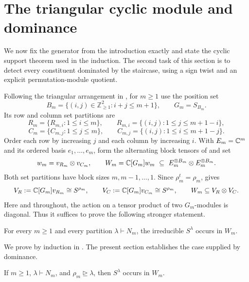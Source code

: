 \section{The triangular cyclic module and dominance}
\label{sec:dominance}

We now fix the generator from the introduction exactly and state the
cyclic support theorem used in the induction. The second task of this
section is to detect every constituent dominated by the staircase,
using a sign twist and an explicit permutation-module quotient.

Following the triangular arrangement in \cite[Section~4]{ikenmeyer2015},
for $m\ge1$ use the position set
\begin{equation}
 B_m=\{(i,j)\in\mathbb Z_{\ge1}^2:i+j\le m+1\},
 \qquad G_m=S_{B_m}.
 \label{dom:triangle}
\end{equation}
Its row and column set partitions are
\[
 R_m=\{R_{m,i}:1\le i\le m\},\qquad
 R_{m,i}=\{(i,j):1\le j\le m+1-i\},
\]
\[
 C_m=\{C_{m,j}:1\le j\le m\},\qquad
 C_{m,j}=\{(i,j):1\le i\le m+1-j\}.
\]
Order each row by increasing $j$ and each column by increasing $i$.
With $E_m=\mathbb C^m$ and its ordered basis $e_1,\ldots,e_m$, form the
alternating block tensors of  and set
\begin{equation}
 w_m=v_{R_m}\otimes v_{C_m},\qquad
 W_m=\mathbb C[G_m]w_m
 \ \subseteq\ E_m^{\otimes B_m}\otimes E_m^{\otimes B_m}.
 \label{dom:cyclic-module}
\end{equation}
Both set partitions have block sizes $m,m-1,\ldots,1$.
Since $\rho_m^t=\rho_m$,  gives
\begin{equation}
 V_R:=\mathbb C[G_m]v_{R_m}\cong S^{\rho_m},\qquad
 V_C:=\mathbb C[G_m]v_{C_m}\cong S^{\rho_m},\qquad
 W_m\subseteq V_R\otimes V_C.
 \label{dom:square-inclusion}
\end{equation}
Here and throughout, the action on a tensor product of two $G_m$-modules
is diagonal.  Thus it suffices to prove the following stronger statement.

\begin{theorem}
\label{thm:cyclic-saxl}
For every $m\ge1$ and every partition $\lambda\vdash N_m$, the irreducible
$S^\lambda$ occurs in $W_m$.
\end{theorem}

We prove  by induction in .
The present section establishes the case supplied by dominance.

\begin{proposition}
\label{prop:dominated}
If $m\ge1$, $\lambda\vdash N_m$, and $\rho_m\unrhd\lambda$, then
$S^\lambda$ occurs in $W_m$.
\end{proposition}

